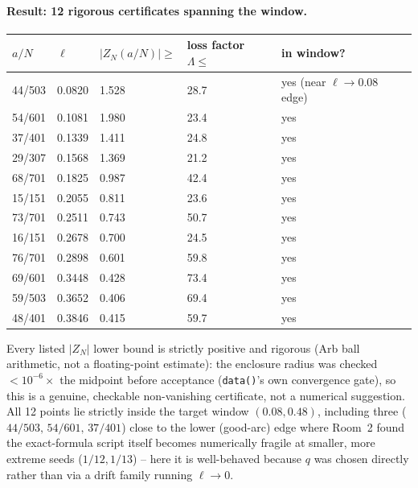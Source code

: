 \documentclass[11pt]{article}
\begin{document}
\paragraph{Result: 12 rigorous certificates spanning the window.}
\begin{center}\small\begin{tabular}{lllll}\toprule
$a/N$ & $\ell$ & $|Z_N(a/N)|\ge$ & loss factor $\Lambda\le$ & in window?\\\midrule
44/503 & 0.0820 & 1.528 & 28.7 & yes (near $\ell\to0.08$ edge)\\
54/601 & 0.1081 & 1.980 & 23.4 & yes\\
37/401 & 0.1339 & 1.411 & 24.8 & yes\\
29/307 & 0.1568 & 1.369 & 21.2 & yes\\
68/701 & 0.1825 & 0.987 & 42.4 & yes\\
15/151 & 0.2055 & 0.811 & 23.6 & yes\\
73/701 & 0.2511 & 0.743 & 50.7 & yes\\
16/151 & 0.2678 & 0.700 & 24.5 & yes\\
76/701 & 0.2898 & 0.601 & 59.8 & yes\\
69/601 & 0.3448 & 0.428 & 73.4 & yes\\
59/503 & 0.3652 & 0.406 & 69.4 & yes\\
48/401 & 0.3846 & 0.415 & 59.7 & yes\\\bottomrule
\end{tabular}\end{center}
Every listed $|Z_N|$ lower bound is strictly positive and rigorous (Arb ball arithmetic, not a
floating-point estimate): the enclosure radius was checked $<10^{-6}\times$ the midpoint before
acceptance (\texttt{data()}'s own convergence gate), so this is a genuine, checkable
non-vanishing certificate, not a numerical suggestion. All 12 points lie strictly inside the
target window $(0.08,0.48)$, including three ($44/503,\,54/601,\,37/401$) close to the
lower (good-arc) edge where Room~2 found the exact-formula script itself becomes numerically
fragile at smaller, more extreme seeds ($1/12,1/13$) -- here it is well-behaved because $q$ was
chosen directly rather than via a drift family running $\ell\to0$.
\end{document}
